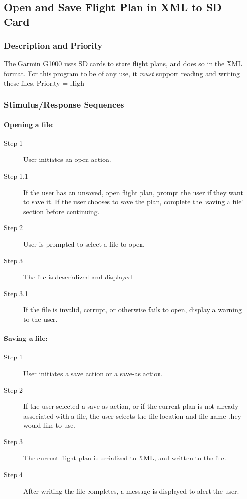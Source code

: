 \documentclass[12pt, letterpaper]{article}
\begin{document}
        \subsection{Open and Save Flight Plan in XML to SD Card}
          \subsubsection{Description and Priority}
            The Garmin G1000 uses SD cards to store flight plans, and does so in the XML format.
            For this program to be of any use, it \emph{must} support reading and writing these files.
            Priority = High
          \subsubsection{Stimulus/Response Sequences}
            \paragraph{Opening a file:}
            \begin{description}
              \item[Step 1] User initiates an open action.
              \item[Step 1.1] If the user has an unsaved, open flight plan, prompt the user if they want to save it.
                If the user chooses to save the plan, complete the `saving a file' section before continuing.
              \item[Step 2] User is prompted to select a file to open.
              \item[Step 3] The file is deserialized and displayed.
              \item[Step 3.1] If the file is invalid, corrupt, or otherwise fails to open, display a warning to the user.
            \end{description}
            \paragraph{Saving a file:}
            \begin{description}
              \item[Step 1] User initiates a save action or a save-as action.
              \item[Step 2] If the user selected a save-as action, or if the current plan is not already associated with a file,
                the user selects the file location and file name they would like to use.
              \item[Step 3] The current flight plan is serialized to XML, and written to the file.
              \item[Step 4] After writing the file completes, a message is displayed to alert the user.
            \end{description}
\end{document}
